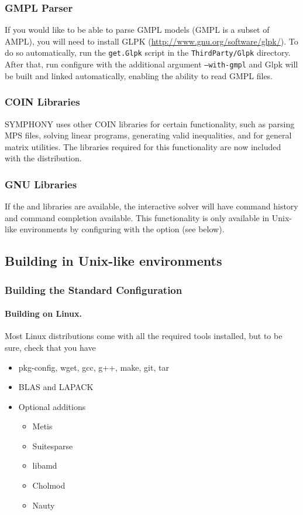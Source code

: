 \subsubsection{GMPL Parser} If you would like to be able to parse GMPL models
(GMPL is a subset of AMPL), you will need to install GLPK
(\url{http://www.gnu.org/software/glpk/}). To do so automatically, run the
\texttt{get.Glpk} script in the \texttt{ThirdParty/Glpk} directory. After
that, run configure with the additional argument \texttt{--with-gmpl} and Glpk 
will be built and linked automatically, enabling the ability to read GMPL 
files.

\subsubsection{COIN Libraries} SYMPHONY uses other COIN libraries for certain
functionality, such as parsing MPS files, solving linear programs, generating
valid inequalities, and for general matrix utilities. The libraries required
for this functionality are now included with the distribution.

\subsubsection{GNU Libraries} If the  and  libraries
are available, the interactive solver will have command history and command
completion available. This functionality is only available in Unix-like
environments by configuring with the  option (see
below).

\subsection{Building in Unix-like environments}
\label{getting_started_unix}

\subsubsection{Building the Standard Configuration}

\paragraph{Building on Linux.}

Most Linux distributions come with all the required tools installed, but to be
sure, check that you have
\begin{itemize}
  \item pkg-config, wget, gcc, g++, make, git, tar
  \item BLAS and LAPACK
  \item Optional additions
    \begin{itemize}
    \item Metis
    \item Suitesparse
    \item libamd
    \item Cholmod
    \item Nauty
    \end{itemize}
\end{itemize}

